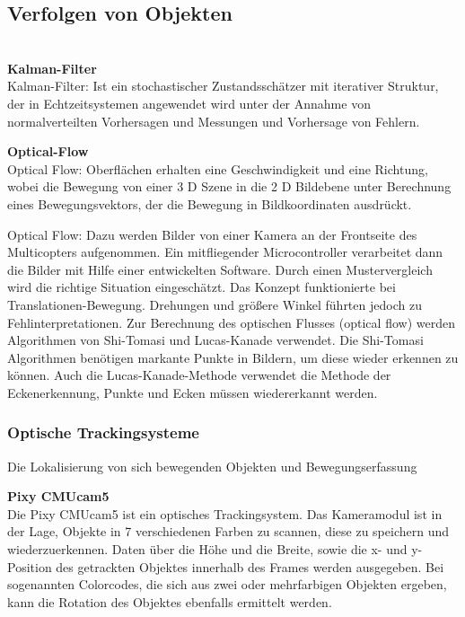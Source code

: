     \subsection*{Verfolgen von Objekten}\\
    \textbf{Kalman-Filter}\\
    Kalman-Filter: Ist ein stochastischer Zustandsschätzer mit iterativer Struktur, der in Echtzeitsystemen angewendet wird unter der Annahme von normalverteilten Vorhersagen und Messungen und Vorhersage von Fehlern.

    \textbf{Optical-Flow}\\
    Optical Flow: Oberflächen erhalten eine Geschwindigkeit und eine Richtung, wobei die Bewegung von einer 3 D Szene in die 2 D Bildebene unter Berechnung eines Bewegungsvektors, der die Bewegung in Bildkoordinaten ausdrückt.

    Optical Flow:
    Dazu werden Bilder von einer Kamera an der Frontseite des Multicopters aufgenommen. Ein mitfliegender Microcontroller verarbeitet dann die Bilder mit Hilfe einer entwickelten Software. Durch einen Mustervergleich wird die richtige Situation eingeschätzt. Das Konzept funktionierte bei Translationen-Bewegung. Drehungen und größere Winkel führten jedoch zu Fehlinterpretationen. Zur Berechnung des optischen Flusses (optical flow) werden Algorithmen von Shi-Tomasi und Lucas-Kanade verwendet. Die Shi-Tomasi Algorithmen benötigen markante Punkte in Bildern, um diese wieder erkennen zu können. Auch die Lucas-Kanade-Methode verwendet die Methode der Eckenerkennung, Punkte und Ecken müssen wiedererkannt werden. \cite{opticalflow}

    \subsubsection{Optische Trackingsysteme}

    Die Lokalisierung von sich bewegenden Objekten und Bewegungserfassung

    \textbf{Pixy CMUcam5}\\
    Die Pixy CMUcam5 ist ein optisches Trackingsystem. Das Kameramodul ist in der Lage, Objekte in 7 verschiedenen Farben zu scannen, diese zu speichern und wiederzuerkennen. Daten über die Höhe und die Breite, sowie die x- und y-Position des getrackten Objektes innerhalb des Frames werden ausgegeben. Bei sogenannten Colorcodes, die sich aus zwei oder mehrfarbigen Objekten ergeben, kann die Rotation des Objektes ebenfalls ermittelt werden.

